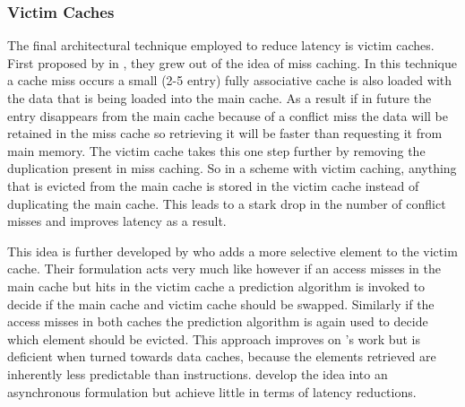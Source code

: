 \subsubsection{Victim Caches}

The final architectural technique employed to reduce latency is victim caches. First proposed by \citet{jouppiImprovingDirectmappedCache1990} in \citeyear{jouppiImprovingDirectmappedCache1990}, they grew out of the idea of miss caching. In this technique a cache miss occurs a small (2-5 entry) fully associative cache is also loaded with the data that is being loaded into the main cache. As a result if in future the entry disappears from the main cache because of a conflict miss the data will be retained in the miss cache so retrieving it will be faster than requesting it from main memory. The victim cache takes this one step further by removing the duplication present in miss caching. So in a scheme with victim caching, anything that is evicted from the main cache is stored in the victim cache instead of duplicating the main cache. This leads to a stark drop in the number of conflict misses and improves latency as a result. 

This idea is further developed by \citet{stiliadisSelectiveVictimCaching1997} who adds a more selective element to the victim cache. Their formulation acts very much like \citeauthor{jouppiImprovingDirectmappedCache1990} however if an access misses in the main cache but hits in the victim cache a prediction algorithm is invoked to decide if the main cache and victim cache should be swapped. Similarly if the access misses in both caches the prediction algorithm is again used to decide which element should be evicted. This approach improves on \citeauthor{jouppiImprovingDirectmappedCache1990}'s work but is deficient when turned towards data caches, because the elements retrieved are inherently less predictable than instructions. \citet{hormdeeAsynchronousVictimCache2002} develop the idea into an asynchronous formulation but achieve little in terms of latency reductions.

